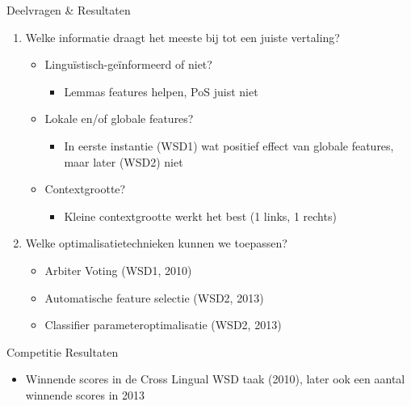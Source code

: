 \documentclass[8pt]{beamer}
\begin{document}
\begin{frame}
    \begin{block}{Deelvragen \& Resultaten}
        \begin{enumerate}
            \item Welke informatie draagt het meeste bij tot een juiste vertaling?
            \begin{itemize}
                \item Linguïstisch-geïnformeerd of niet?
                \begin{itemize}
                    \item<2-> Lemmas features helpen, PoS juist niet
                \end{itemize}
                \item Lokale en/of globale features?
                \begin{itemize}
                    \item<2-> In eerste instantie (WSD1) wat positief effect van globale features, maar later (WSD2) niet
                \end{itemize}
                \item Contextgrootte?
                \begin{itemize}
                    \item<2-> Kleine contextgrootte werkt het best (1 links, 1 rechts)
                \end{itemize}
            \end{itemize}
            \item Welke optimalisatietechnieken kunnen we toepassen?
            \begin{itemize}
                \item<2-> Arbiter Voting (WSD1, 2010)
                \item<2-> Automatische feature selectie (WSD2, 2013)
                \item<2-> Classifier parameteroptimalisatie (WSD2, 2013)
            \end{itemize}
        \end{enumerate}
    \end{block}
    \begin{block}{Competitie Resultaten}
        \begin{itemize}
            \item<2-> Winnende scores in de Cross Lingual WSD taak (2010), later ook een aantal winnende scores in 2013
        \end{itemize}
    \end{block}
\end{frame}
\end{document}
